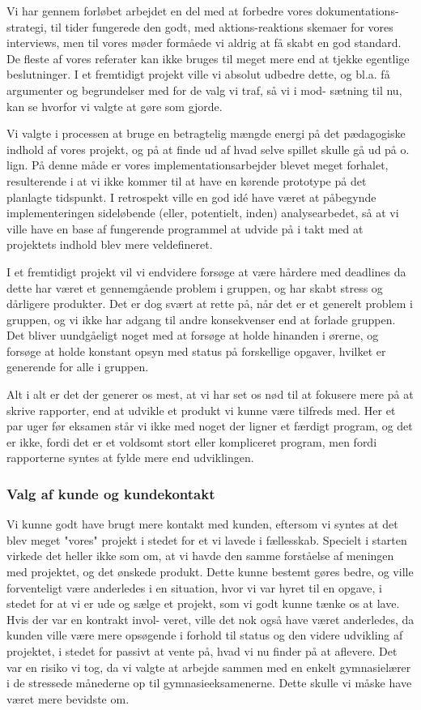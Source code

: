\documentclass[10pt,a4paper,danish]{article}
\begin{document}
Vi har gennem forløbet arbejdet en del med at forbedre vores dokumentations-
strategi, til tider fungerede den godt, med aktions-reaktions skemaer for vores
interviews, men til vores møder formåede vi aldrig at få skabt en god standard.
De fleste af vores referater kan ikke bruges til meget mere end at tjekke
egentlige beslutninger. I et fremtidigt projekt ville vi absolut udbedre dette,
og bl.a. få argumenter og begrundelser med for de valg vi traf, så vi i mod-
sætning til nu, kan se hvorfor vi valgte at gøre som gjorde.

Vi valgte i processen at bruge en betragtelig mængde energi på det pædagogiske indhold
af vores projekt, og på at finde ud af hvad selve spillet skulle gå ud på o. lign. På 
denne måde er vores implementationsarbejder blevet meget forhalet, resulterende i at
vi ikke kommer til at have en kørende prototype på det planlagte tidspunkt. I retrospekt
ville en god idé have været at påbegynde implementeringen sideløbende (eller, potentielt, 
inden) analysearbedet, så at vi ville have en base af fungerende programmel at udvide
på i takt med at projektets indhold blev mere veldefineret.

I et fremtidigt projekt vil vi endvidere forsøge at være hårdere med deadlines da dette har
været et gennemgående problem i gruppen, og har skabt stress og dårligere
produkter. Det er dog svært at rette på, når det er et generelt problem i
gruppen, og vi ikke har adgang til andre konsekvenser end at forlade gruppen.
Det bliver uundgåeligt noget med at forsøge at holde hinanden i ørerne, og
forsøge at holde konstant opsyn med status på forskellige opgaver, hvilket er
generende for alle i gruppen. 

Alt i alt er det der generer os mest, at vi har set os nød til at fokusere mere
på at skrive rapporter, end at udvikle et produkt vi kunne være tilfreds med.
Her et par uger før eksamen står vi ikke med noget der ligner et færdigt program,
og det er ikke, fordi det er et voldsomt stort eller kompliceret program, men
fordi rapporterne syntes at fylde mere end udviklingen. 

\subsubsection{Valg af kunde og kundekontakt}
Vi kunne godt have brugt mere kontakt med kunden, eftersom vi syntes at det blev meget "vores" projekt
i stedet for et vi lavede i fællesskab. Specielt i starten virkede det heller ikke som om, at vi 
havde den samme forståelse af meningen med projektet, og det ønskede produkt.
Dette kunne bestemt gøres bedre, og ville forventeligt være anderledes i en
situation, hvor vi var hyret til en opgave, i stedet for at vi er ude og sælge
et projekt, som vi godt kunne tænke os at lave. Hvis der var en kontrakt invol-
veret, ville det nok også have været anderledes, da kunden ville være mere 
opsøgende i forhold til status og den videre udvikling af projektet, i stedet
for passivt at vente på, hvad vi nu finder på at aflevere. Det var en risiko vi
tog, da vi valgte at arbejde sammen med en enkelt gymnasielærer i de stressede
månederne op til gymnasieeksamenerne. Dette skulle vi måske have været mere
bevidste om. 
\end{document}
